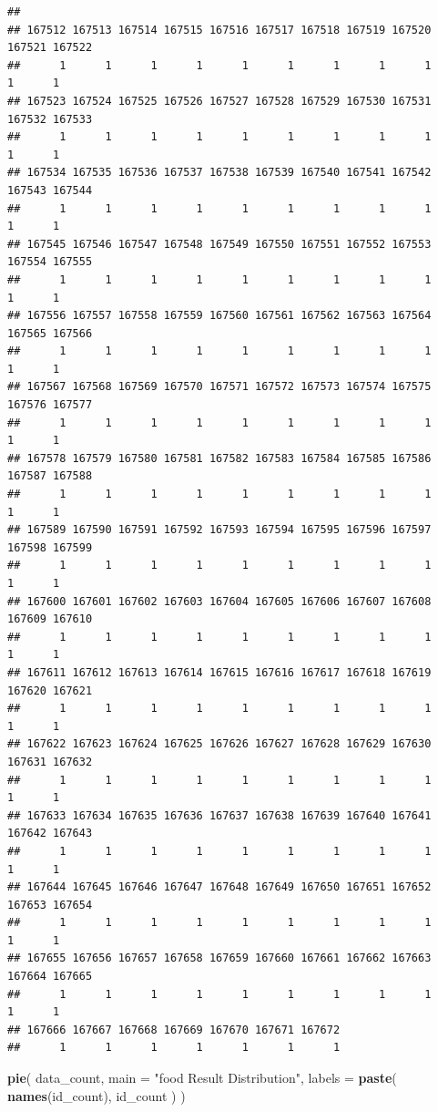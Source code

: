 \documentclass[
]{article}
\newenvironment{Shaded}{\begin{snugshade}}{\end{snugshade}}
\newcommand{\AttributeTok}[1]{\textcolor[rgb]{0.13,0.29,0.53}{#1}}
\newcommand{\FunctionTok}[1]{\textcolor[rgb]{0.13,0.29,0.53}{\textbf{#1}}}
\newcommand{\NormalTok}[1]{#1}
\newcommand{\StringTok}[1]{\textcolor[rgb]{0.31,0.60,0.02}{#1}}
\begin{document}
\begin{verbatim}
## 
## 167512 167513 167514 167515 167516 167517 167518 167519 167520 167521 167522 
##      1      1      1      1      1      1      1      1      1      1      1 
## 167523 167524 167525 167526 167527 167528 167529 167530 167531 167532 167533 
##      1      1      1      1      1      1      1      1      1      1      1 
## 167534 167535 167536 167537 167538 167539 167540 167541 167542 167543 167544 
##      1      1      1      1      1      1      1      1      1      1      1 
## 167545 167546 167547 167548 167549 167550 167551 167552 167553 167554 167555 
##      1      1      1      1      1      1      1      1      1      1      1 
## 167556 167557 167558 167559 167560 167561 167562 167563 167564 167565 167566 
##      1      1      1      1      1      1      1      1      1      1      1 
## 167567 167568 167569 167570 167571 167572 167573 167574 167575 167576 167577 
##      1      1      1      1      1      1      1      1      1      1      1 
## 167578 167579 167580 167581 167582 167583 167584 167585 167586 167587 167588 
##      1      1      1      1      1      1      1      1      1      1      1 
## 167589 167590 167591 167592 167593 167594 167595 167596 167597 167598 167599 
##      1      1      1      1      1      1      1      1      1      1      1 
## 167600 167601 167602 167603 167604 167605 167606 167607 167608 167609 167610 
##      1      1      1      1      1      1      1      1      1      1      1 
## 167611 167612 167613 167614 167615 167616 167617 167618 167619 167620 167621 
##      1      1      1      1      1      1      1      1      1      1      1 
## 167622 167623 167624 167625 167626 167627 167628 167629 167630 167631 167632 
##      1      1      1      1      1      1      1      1      1      1      1 
## 167633 167634 167635 167636 167637 167638 167639 167640 167641 167642 167643 
##      1      1      1      1      1      1      1      1      1      1      1 
## 167644 167645 167646 167647 167648 167649 167650 167651 167652 167653 167654 
##      1      1      1      1      1      1      1      1      1      1      1 
## 167655 167656 167657 167658 167659 167660 167661 167662 167663 167664 167665 
##      1      1      1      1      1      1      1      1      1      1      1 
## 167666 167667 167668 167669 167670 167671 167672 
##      1      1      1      1      1      1      1
\end{verbatim}

\begin{Shaded}
\begin{Highlighting}[]
\FunctionTok{pie}\NormalTok{(}
\NormalTok{  data\_count,}
  \AttributeTok{main =} \StringTok{"food  Result Distribution"}\NormalTok{,}
  \AttributeTok{labels =} \FunctionTok{paste}\NormalTok{(}
    \FunctionTok{names}\NormalTok{(id\_count),}
\NormalTok{    id\_count}
\NormalTok{  )}
\NormalTok{)}
\end{Highlighting}
\end{Shaded}
\end{document}
